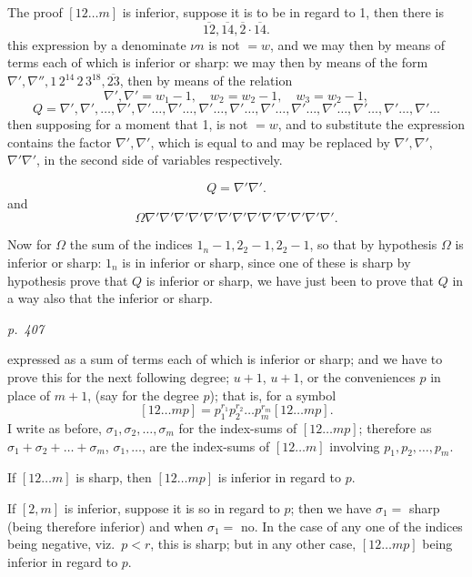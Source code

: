 \documentclass[11pt,a4paper]{book}
\begin{document}
The proof $[12 \ldots m]$ is inferior, suppose it is to be in regard to 1, then there is
\[
\overline{12}, \overline{14}, \overline{2} \cdot \overline{14}.
\]
this expression by a denominate $\nu n$ is not $= w$, and we may then by means of
terms each of which is inferior or sharp: we may then by means of
the form $\nabla', \nabla'', 1\,2^{14} \,2\,3^{18}, \overline{23}$, then by means of the relation
\[
\nabla', \nabla' = w_1 - 1, \quad w_2 = w_2 - 1, \quad w_3 = w_2 - 1,
\]
\[
Q = \nabla', \nabla', \ldots, \nabla', \nabla' \ldots, \nabla' \ldots, \nabla' \ldots, \nabla' \ldots, \nabla' \ldots, \nabla' \ldots, \nabla' \ldots, \nabla' \ldots, \nabla' \ldots, \nabla' \ldots
\]
then supposing for a moment that 1, is not $= w$, and to substitute the expression
contains the factor $\nabla', \nabla'$, which is equal to and may be replaced by $\nabla', \nabla'$, $\nabla' \nabla'$,
in the second side of variables respectively.

\[
Q = \nabla' \nabla'.
\]
and
\[
\Omega \nabla' \nabla' \nabla' \nabla' \nabla' \nabla' \nabla' \nabla' \nabla' \nabla' \nabla' \nabla' \nabla'.
\]

Now for $\Omega$ the sum of the indices $1_n - 1, 2_2 - 1, 2_2 - 1$, so that by hypothesis
$\Omega$ is inferior or sharp: $1_n$ is in inferior or sharp, since one of these is sharp by hypothesis
prove that $Q$ is inferior or sharp, we have just been to prove that $Q$ in a way also that
the inferior or sharp.

\clearpage

\bigskip
\textit{p.~407}
\smallskip

\noindent
expressed as a sum of terms each of which is inferior or sharp; and we have to
prove this for the next following degree; $u + 1$, $u + 1$, or the conveniences $p$ in place
of $m + 1$, (say for the degree $p$); that is, for a symbol
\[
[12 \ldots m p] = p_1^{r_1} p_2^{r_2} \ldots p_m^{r_m} [12 \ldots m p].
\]
I write as before, $\sigma_1, \sigma_2, \ldots, \sigma_m$ for the index-sums of $[12 \ldots m p]$; therefore as
$\sigma_1 + \sigma_2 + \ldots + \sigma_m$, $\sigma_1, \ldots$, are the index-sums of $[12 \ldots m]$ involving $p_1, p_2, \ldots, p_m$.

If $[12 \ldots m]$ is sharp, then $[12 \ldots m p]$ is inferior in regard to $p$.

If $[2, m]$ is inferior, suppose it is so in regard to $p$; then we have $\sigma_1 = $ sharp (being therefore
inferior) and when $\sigma_1 = $ no.  In the case of any one of the indices being negative,
viz.\ $p < r$, this is sharp; but in any other case, $[12 \ldots m p]$ being inferior in regard to $p$.
\end{document}
